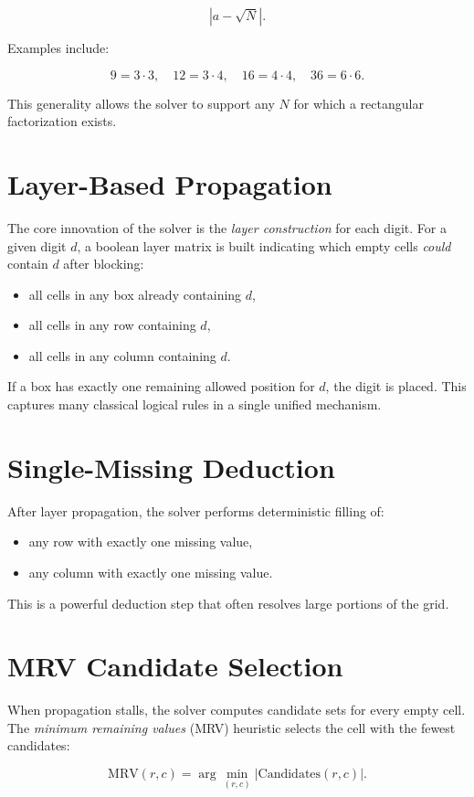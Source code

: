 \documentclass[11pt]{article}
\begin{document}
\[
|a - \sqrt{N}|.
\]


Examples include:


\[
9 = 3 \cdot 3,\quad 12 = 3 \cdot 4,\quad 16 = 4 \cdot 4,\quad 36 = 6 \cdot 6.
\]


This generality allows the solver to support any $N$ for which a rectangular factorization exists.

\section{Layer-Based Propagation}
The core innovation of the solver is the \emph{layer construction} for each digit.
For a given digit $d$, a boolean layer matrix is built indicating which empty cells
\emph{could} contain $d$ after blocking:
\begin{itemize}
    \item all cells in any box already containing $d$,
    \item all cells in any row containing $d$,
    \item all cells in any column containing $d$.
\end{itemize}

If a box has exactly one remaining allowed position for $d$, the digit is placed.
This captures many classical logical rules in a single unified mechanism.

\section{Single-Missing Deduction}
After layer propagation, the solver performs deterministic filling of:
\begin{itemize}
    \item any row with exactly one missing value,
    \item any column with exactly one missing value.
\end{itemize}
This is a powerful deduction step that often resolves large portions of the grid.

\section{MRV Candidate Selection}
When propagation stalls, the solver computes candidate sets for every empty cell.
The \emph{minimum remaining values} (MRV) heuristic selects the cell with the fewest
candidates:


\[
\text{MRV}(r,c) = \arg\min_{(r,c)} |\text{Candidates}(r,c)|.
\]
\end{document}
